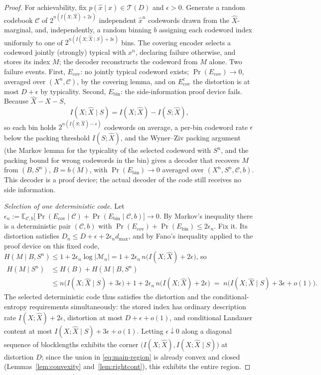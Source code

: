 ﻿\documentclass[11pt,onecolumn]{IEEEtran}
\newcommand{\E}{\mathbb{E}}
\newcommand{\hX}{\widehat{X}}
\begin{document}
\begin{proof}
For achievability, fix $p(\hat x\mid x)\in\mathcal T(D)$ and $\epsilon>0$.
Generate a random codebook $\mathcal C$ of $2^{n(I(X;\hX)+2\epsilon)}$
independent $\hat x^n$ codewords drawn from the $\hX$-marginal, and,
independently, a random binning $b$ assigning each codeword index
uniformly to one of $2^{n(I(X;\hX\mid S)+3\epsilon)}$ bins. The covering
encoder selects a codeword jointly (strongly) typical with $x^n$,
declaring failure otherwise, and stores its index $M$; the decoder
reconstructs the codeword from $M$ alone. Two failure events. First,
$E_{\mathrm{cov}}$: no jointly typical codeword exists;
$\Pr(E_{\mathrm{cov}})\to0$, averaged over $(X^n,\mathcal C)$, by the
covering lemma, and on $E_{\mathrm{cov}}^{\mathrm c}$ the distortion is
at most $D+\epsilon$ by typicality. Second, $E_{\mathrm{bin}}$: the
side-information proof device fails. Because $\hX-X-S$,
\begin{equation}
 I(X;\hX\mid S)=I(X;\hX)-I(S;\hX),
\end{equation}
so each bin holds $2^{n(I(S;\hX)-\epsilon)}$ codewords on average, a
per-bin codeword rate $\epsilon$ below the packing threshold $I(S;\hX)$,
and the Wyner--Ziv packing argument \cite{wynerziv1976} (the Markov lemma for
the typicality of the selected codeword with $S^n$, and the packing
bound for wrong codewords in the bin) gives a decoder that recovers $M$
from $(B,S^n)$, $B=b(M)$, with
$\Pr(E_{\mathrm{bin}})\to0$ averaged over $(X^n,S^n,\mathcal C,b)$.
This decoder is a proof device; the actual decoder of the code still
receives no side information.

\emph{Selection of one deterministic code.} Let
$\epsilon_n:=\E_{\mathcal C,b}\bigl[\Pr(E_{\mathrm{cov}}\mid\mathcal C)
+\Pr(E_{\mathrm{bin}}\mid\mathcal C,b)\bigr]\to0$. By Markov's
inequality there is a deterministic pair $(\mathcal C,b)$ with
$\Pr(E_{\mathrm{cov}})+\Pr(E_{\mathrm{bin}})\le2\epsilon_n$. Fix it.
Its distortion satisfies
$D_n\le D+\epsilon+2\epsilon_n d_{\max}$, and by Fano's inequality
applied to the proof device on this fixed code,
$H(M\mid B,S^n)\le1+2\epsilon_n\log|\mathcal M_n|
=1+2\epsilon_n\,n\bigl(I(X;\hX)+2\epsilon\bigr)$, so
\begin{align}
 H(M\mid S^n)
 &\le H(B)+H(M\mid B,S^n)\nonumber\\
 &\le n\bigl(I(X;\hX\mid S)+3\epsilon\bigr)
 +1+2\epsilon_n\,n\bigl(I(X;\hX)+2\epsilon\bigr)
 \;=\;n\bigl(I(X;\hX\mid S)+3\epsilon+o(1)\bigr).
 \label{eq:entropy-ach}
\end{align}
The selected deterministic code thus satisfies the distortion and the
conditional-entropy requirements simultaneously: the stored index has
ordinary description rate $I(X;\hX)+2\epsilon$, distortion at most
$D+\epsilon+o(1)$, and conditional Landauer content at most
$I(X;\hX\mid S)+3\epsilon+o(1)$. Letting $\epsilon\downarrow0$ along a
diagonal sequence of blocklengths exhibits the corner
$\bigl(I(X;\hX),I(X;\hX\mid S)\bigr)$ at distortion $D$; since the
union in \eqref{eq:main-region} is already convex and closed
(Lemmas~\ref{lem:convexity} and~\ref{lem:rightcont}), this exhibits
the entire region.
\end{proof}
\end{document}
